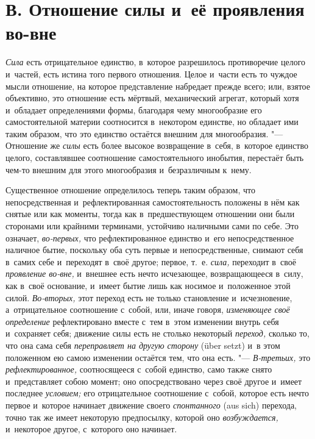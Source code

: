 \section[В. Отношение силы и~её проявления во-вне]
{В. Отношение силы и~её проявления во-вне}

{\em Сила} есть
отрицательное единство, в~которое разрешилось противоречие целого и~частей,
есть истина того первого отношения. Целое и~части есть то чуждое мысли
отношение, на которое представление набредает прежде всего; или, взятое
объективно, это отношение есть мёртвый, механический агрегат, который хотя
и~обладает определениями формы, благодаря чему многообразие его
самостоятельной материи соотносится в~некотором единстве, но обладает ими
таким образом, что это единство остаётся внешним для многообразия. "---
Отношение же {\em силы} есть более высокое возвращение
в~себя, в~которое единство целого, составлявшее соотношение
самостоятельного инобытия, перестаёт быть чем-то внешним для этого
многообразия и~безразличным к~нему.

Существенное отношение определилось теперь таким образом, что
непосредственная и~рефлектированная самостоятельность положены в
нём
как снятые или как моменты, тогда как в~предшествующем отношении они были
сторонами или крайними терминами, устойчиво наличными сами по себе. Это
означает, {\em во-первых,} что рефлектированное
единство и~его непосредственное наличное бытие, поскольку оба суть первые и
непосредственные, снимают себя в~самих себе и~переходят в~своё другое;
первое, т.~е. {\em сила,} переходит в~своё
{\em проявление во-вне,} и~внешнее есть нечто
исчезающее, возвращающееся в~силу, как в~своё основание, и~имеет бытие лишь
как носимое и~положенное этой силой. {\em Во-вторых,}
этот переход есть не только становление и~исчезновение, а~отрицательное
соотношение с~собой, или, иначе говоря, {\em изменяющее
своё определение} рефлектировано вместе с~тем в~этом изменении внутрь себя
и~сохраняет себя; движение силы есть не столько некоторый
{\em переход,} сколько то, что она сама себя
{\em переправляет на другую сторону} (über setzt) и~в
этом положенном ею самою изменении остаётся тем, что она есть. "---
{\em В-третьих,} это {\em рефлектированное,} соотносящееся с~собой единство,
само также снято и~представляет собою момент; оно опосредствовано через
своё другое и~имеет последнее {\em условием;} его
отрицательное соотношение с~собой, которое есть нечто первое и~которое
начинает движение своего {\em спонтанного} (aus sich) перехода,
точно так же имеет некоторую предпосылку, которой оно
{\em возбуждается,} и~некоторое другое, с~которого оно начинает.

